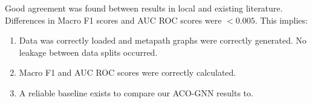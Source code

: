 Good agreement was found between results in local and existing literature. Differences in Macro F1 scores and AUC ROC scores were $<0.005$. This implies:
\begin{enumerate}
    \item Data was correctly loaded and metapath graphs were correctly generated. No leakage between data splits occurred.
    \item Macro F1 and AUC ROC scores were correctly calculated.
    \item A reliable baseline exists to compare our ACO-GNN results to.
\end{enumerate}
